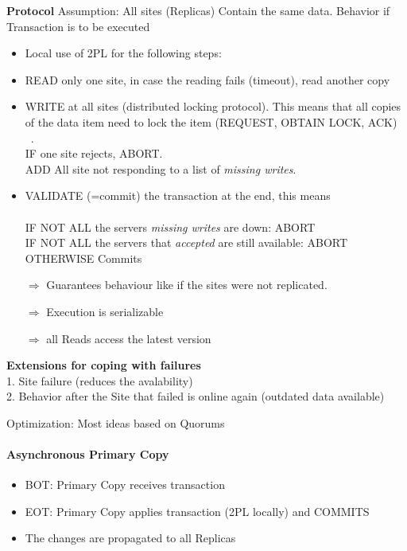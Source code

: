 \documentclass[a4paper,12pt]{article}%
\newif\ifcomment
\begin{document}
 {\bf Protocol}
 Assumption: All sites (Replicas) Contain the same data. Behavior if Transaction is to be executed
 \begin{itemize}
  \item Local use of 2PL for the following steps:
  \item READ only one site, in case the reading fails (timeout), read another copy
  \item WRITE at all sites (distributed locking protocol). This means that all copies of the data item need to lock the item (REQUEST, OBTAIN LOCK, ACK)\\~. \\
  IF one site rejects, ABORT. \\
  ADD All site not responding to a list of {\it missing writes}.
  \item VALIDATE (=commit) the transaction at the end, this means\\~ \\ 
  IF NOT ALL the servers {\it missing writes} are down: ABORT \\
  IF NOT ALL the servers that {\it accepted} are still available: ABORT \\
  OTHERWISE Commits
 \end{itemize}

 
 
 \begin{itemize}
  \item[$\Rightarrow$] Guarantees behaviour like if the sites were not replicated.
  \item[$\Rightarrow$]  Execution is serializable
  \item[$\Rightarrow$]  all Reads access the latest version
 \end{itemize}

 {\bf Extensions for coping with failures} \\
 1. Site failure (reduces the avalability) \\
 2. Behavior after the Site that failed is online again (outdated data available)
 
 
 
 Optimization: Most ideas based on Quorums
 
 \ifcomment
 \paragraph{Asynchronous Primary Copy}
 \begin{itemize}
  \item BOT: Primary Copy receives transaction
  \item EOT: Primary Copy applies transaction (2PL locally) and COMMITS
  \item The changes are propagated to all Replicas
 \end{itemize}
\end{document}
